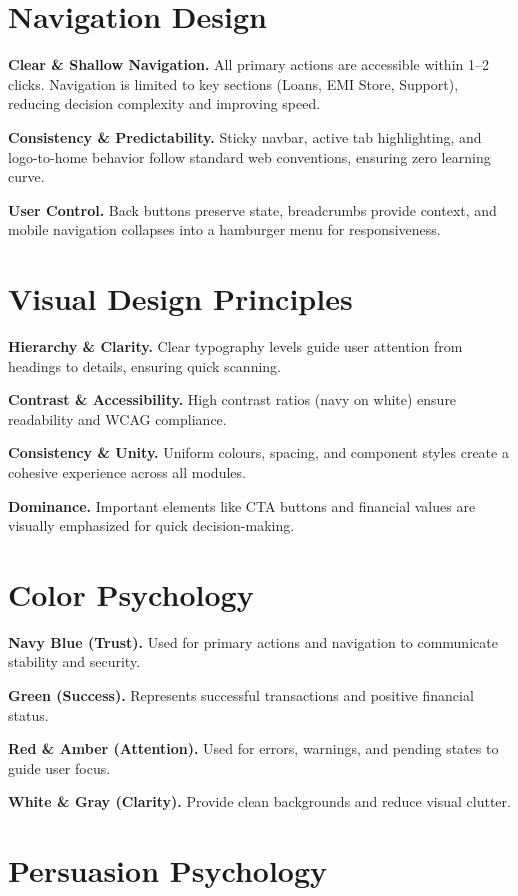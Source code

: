 \documentclass[11pt,a4paper]{article}
\begin{document}
\section{Navigation Design}

\textbf{Clear \& Shallow Navigation.}
All primary actions are accessible within 1--2 clicks. Navigation is limited to key sections (Loans, EMI Store, Support), reducing decision complexity and improving speed.

\textbf{Consistency \& Predictability.}
Sticky navbar, active tab highlighting, and logo-to-home behavior follow standard web conventions, ensuring zero learning curve.

\textbf{User Control.}
Back buttons preserve state, breadcrumbs provide context, and mobile navigation collapses into a hamburger menu for responsiveness.


\section{Visual Design Principles}

\textbf{Hierarchy \& Clarity.}
Clear typography levels guide user attention from headings to details, ensuring quick scanning.

\textbf{Contrast \& Accessibility.}
High contrast ratios (navy on white) ensure readability and WCAG compliance.

\textbf{Consistency \& Unity.}
Uniform colours, spacing, and component styles create a cohesive experience across all modules.

\textbf{Dominance.}
Important elements like CTA buttons and financial values are visually emphasized for quick decision-making.

\section{Color Psychology}

\textbf{Navy Blue (Trust).}
Used for primary actions and navigation to communicate stability and security.

\textbf{Green (Success).}
Represents successful transactions and positive financial status.

\textbf{Red \& Amber (Attention).}
Used for errors, warnings, and pending states to guide user focus.

\textbf{White \& Gray (Clarity).}
Provide clean backgrounds and reduce visual clutter.

\section{Persuasion Psychology}
\end{document}

